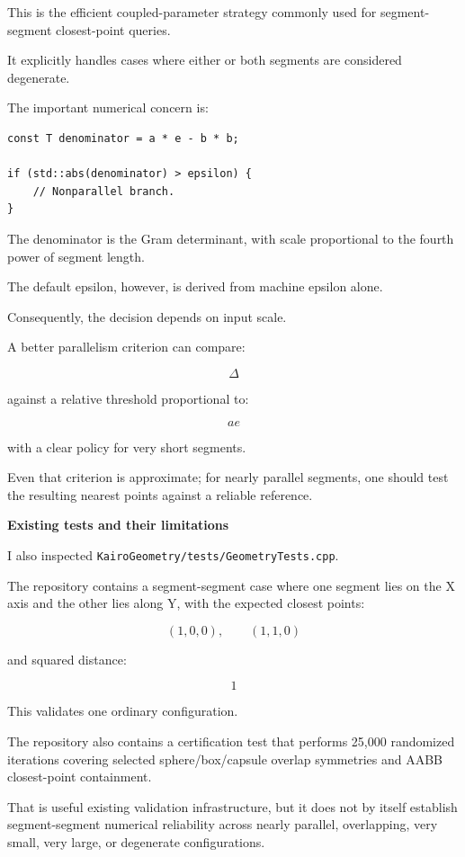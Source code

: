 This is the efficient coupled-parameter strategy commonly used for segment-segment closest-point queries.

It explicitly handles cases where either or both segments are considered degenerate.

The important numerical concern is:

\begin{verbatim}
const T denominator = a * e - b * b;

if (std::abs(denominator) > epsilon) {
    // Nonparallel branch.
}
\end{verbatim}

The denominator is the Gram determinant, with scale proportional to the fourth power of segment length.

The default epsilon, however, is derived from machine epsilon alone.

Consequently, the decision depends on input scale.

A better parallelism criterion can compare:

\[
\Delta
\]

against a relative threshold proportional to:

\[
ae
\]

with a clear policy for very short segments.

Even that criterion is approximate; for nearly parallel segments, one should test the resulting nearest points against a reliable reference.

\textbf{Existing tests and their limitations}

I also inspected \texttt{KairoGeometry/tests/GeometryTests.cpp}.

The repository contains a segment-segment case where one segment lies on the X axis and the other lies along Y, with the expected closest points:

\[
(1,0,0),\qquad(1,1,0)
\]

and squared distance:

\[
1
\]

This validates one ordinary configuration.

The repository also contains a certification test that performs 25,000 randomized iterations covering selected sphere/box/capsule overlap symmetries and AABB closest-point containment.

That is useful existing validation infrastructure, but it does not by itself establish segment-segment numerical reliability across nearly parallel, overlapping, very small, very large, or degenerate configurations.

